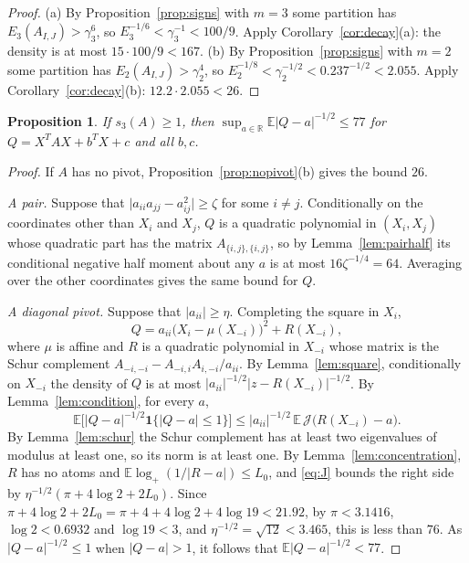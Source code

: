 \documentclass[11pt]{amsart}
\numberwithin{equation}{section}
\newtheorem{proposition}[theorem]{Proposition}
\theoremstyle{definition}
\theoremstyle{remark}
\newcommand{\R}{\mathbb R}
\newcommand{\E}{\mathbb E}
\newcommand{\1}{\mathbf 1}
\newcommand{\logp}{\log_+}
\newcommand{\abs}[1]{\lvert #1\rvert}
\begin{document}
\begin{proof}
(a) By Proposition~\ref{prop:signs} with $m=3$ some partition has $E_3(A_{I,J})>\gamma_3^6$, so $E_3^{-1/6}<\gamma_3^{-1}<100/9$. Apply Corollary~\ref{cor:decay}(a): the density is at most $15\cdot100/9<167$. (b) By Proposition~\ref{prop:signs} with $m=2$ some partition has $E_2(A_{I,J})>\gamma_2^4$, so $E_2^{-1/8}<\gamma_2^{-1/2}<0.237^{-1/2}<2.055$. Apply Corollary~\ref{cor:decay}(b): $12.2\cdot2.055<26$.
\end{proof}

\begin{proposition}\label{prop:halfpotential}
If $s_3(A)\ge1$, then $\sup_{a\in\R}\E\abs{Q-a}^{-1/2}\le77$ for $Q=X^TAX+b^TX+c$ and all $b,c$.
\end{proposition}

\begin{proof}
If $A$ has no pivot, Proposition~\ref{prop:nopivot}(b) gives the bound $26$.

\emph{A pair.} Suppose that $\abs{a_{ii}a_{jj}-a_{ij}^2}\ge\zeta$ for some $i\ne j$. Conditionally on the coordinates other than $X_i$ and $X_j$, $Q$ is a quadratic polynomial in $(X_i,X_j)$ whose quadratic part has the matrix $A_{\{i,j\},\{i,j\}}$, so by Lemma~\ref{lem:pairhalf} its conditional negative half moment about any $a$ is at most $16\zeta^{-1/4}=64$. Averaging over the other coordinates gives the same bound for $Q$.

\emph{A diagonal pivot.} Suppose that $\abs{a_{ii}}\ge\eta$. Completing the square in $X_i$,
\begin{equation}\label{eq:profile}
Q=a_{ii}\bigl(X_i-\mu(X_{-i})\bigr)^2+R(X_{-i}),
\end{equation}
where $\mu$ is affine and $R$ is a quadratic polynomial in $X_{-i}$ whose matrix is the Schur complement $A_{-i,-i}-A_{-i,i}A_{i,-i}/a_{ii}$. By Lemma~\ref{lem:square}, conditionally on $X_{-i}$ the density of $Q$ is at most $\abs{a_{ii}}^{-1/2}\abs{z-R(X_{-i})}^{-1/2}$. By Lemma~\ref{lem:condition}, for every $a$,
\[
\E\bigl[\abs{Q-a}^{-1/2}\1\{\abs{Q-a}\le1\}\bigr]\le\abs{a_{ii}}^{-1/2}\,\E\,\mathcal J\bigl(R(X_{-i})-a\bigr).
\]
By Lemma~\ref{lem:schur} the Schur complement has at least two eigenvalues of modulus at least one, so its norm is at least one. By Lemma~\ref{lem:concentration}, $R$ has no atoms and $\E\logp(1/\abs{R-a})\le L_0$, and \eqref{eq:J} bounds the right side by $\eta^{-1/2}(\pi+4\log2+2L_0)$. Since $\pi+4\log2+2L_0=\pi+4+4\log2+4\log19<21.92$, by $\pi<3.1416$, $\log2<0.6932$ and $\log19<3$, and $\eta^{-1/2}=\sqrt{12}<3.465$, this is less than $76$. As $\abs{Q-a}^{-1/2}\le1$ when $\abs{Q-a}>1$, it follows that $\E\abs{Q-a}^{-1/2}<77$.
\end{proof}
\end{document}
